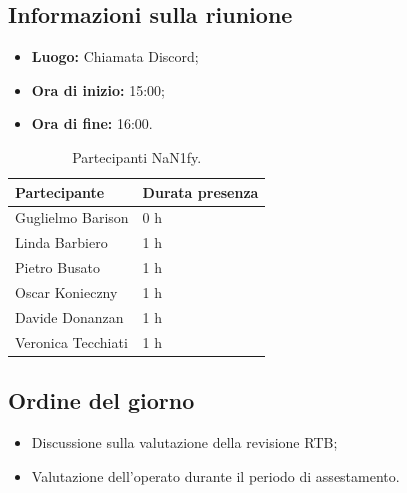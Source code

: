 \documentclass[8pt]{article}
\begin{document}
\subsection{Informazioni sulla riunione}
\begin{itemize}
	\setlength\itemsep{0em}
	\item\textbf{Luogo:} Chiamata Discord;
	\item\textbf{Ora di inizio:} 15:00;
	\item\textbf{Ora di fine:}  16:00.
\end{itemize}
\begin{table}[ht!]
	\begin{minipage}[t]{0.5\linewidth}
		\centering
		\begin{tabular}{p{3cm} p{3cm}}
			\toprule
			\textbf{Partecipante} & \textbf{Durata presenza} \\
			\midrule
			Guglielmo Barison & 0 h \\
			Linda Barbiero & 1 h \\
			Pietro Busato & 1 h \\
			Oscar Konieczny & 1 h \\
			Davide Donanzan & 1 h \\
			Veronica Tecchiati & 1 h \\
			\bottomrule
		\end{tabular}
		\caption{Partecipanti NaN1fy.}
		\label{table:Partecipanti NaN1fy}
	\end{minipage} 
\end{table}
\subsection{Ordine del giorno}
\begin{itemize}
	\setlength\itemsep{0em}
    \item Discussione sulla valutazione della revisione RTB;
    \item Valutazione dell'operato durante il periodo di assestamento.
\end{itemize}
\end{document}
